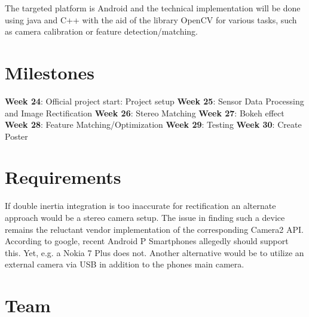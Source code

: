 \documentclass[a4paper,pagesize 10pt]{scrartcl}
\begin{document}
The targeted platform is Android and the technical implementation will be done using java and C++ with the aid of the library OpenCV for various tasks, such as camera calibration or feature detection/matching.

%
%
\section{Milestones}
\textbf{Week 24}: Official project start: Project setup
\textbf{Week 25}: Sensor Data Processing and Image Rectification
\textbf{Week 26}: Stereo Matching 
\textbf{Week 27}: Bokeh effect
\textbf{Week 28}: Feature Matching/Optimization 
\textbf{Week 29}: Testing
\textbf{Week 30}: Create Poster
\section{Requirements}
If double inertia integration is too inaccurate for rectification an alternate approach would be a stereo camera setup. The issue in finding such a device remains the reluctant vendor implementation of the corresponding Camera2 API. According to google, recent Android P Smartphones allegedly should support this. Yet, e.g. a Nokia 7 Plus does not. Another alternative would be to utilize an external camera via USB in addition to the phones main camera.

\section{Team}



{\small
	
	
}
\end{document}

